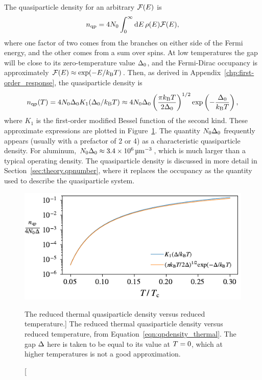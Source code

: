 The quasiparticle density for an arbitrary $\mathcal{F}(E)$ is
\begin{equation}
n_{\mathrm{qp}}
  =
  4 N_0
  \int_{0}^{\infty} \dd{E}
  \rho(E) \mathcal{F}(E),
\label{eqn:qpdensity}
\end{equation}
where one factor of two comes from the branches on either side of the Fermi energy, and the other comes from a sum over spins.
At low temperatures the gap will be close to its zero-temperature value $\Delta_0$, and the Fermi-Dirac occupancy is approximately
$\mathcal{F}(E) \approx \exp (-E / k_\mathrm{B} T)$.
Then, as derived in Appendix~\ref{chp:first-order_response}, the quasiparticle density is
\begin{equation}
n_{\mathrm{qp}}(T)
  =
  4 N_0 \Delta_0
  K_1(\Delta_0 / k_\mathrm{B} T)
  \approx
  4 N_0 \Delta_0
  \left( \frac{\pi k_\mathrm{B} T}{2 \Delta_0} \right)^{1/2}
  \exp \left( -\frac{\Delta_0}{k_\mathrm{B} T} \right),
\label{eqn:qpdensity_thermal}
\end{equation}
where $K_1$ is the first-order modified Bessel function of the second kind.
These approximate expressions are plotted in Figure~\ref{fig:reduced_thermal_qpdensity}.
The quantity $N_0 \Delta_0$ frequently appears (usually with a prefactor of 2 or 4) as a characteristic quasiparticle density.
For aluminum,
$N_0 \Delta_0 \approx \SI{3.4e6}{\micro\meter^{-3}}$,
which is much larger than a typical operating density.
The quasiparticle density is discussed in more detail in Section~\ref{sec:theory.qpnumber}, where it replaces the occupancy as the quantity used to describe the quasiparticle system.

\begin{figure}[htb]
\centering
\includegraphics[width=\textwidth]{theory/reduced_thermal_qpdensity.pdf}
\caption
[The reduced thermal quasiparticle density versus reduced temperature.]
{The reduced thermal quasiparticle density versus reduced temperature, from Equation~\ref{eqn:qpdensity_thermal}.
The gap $\Delta$ here is taken to be equal to its value at $T = 0$, which at higher temperatures is not a good approximation.}
\label{fig:reduced_thermal_qpdensity}
\end{figure}

